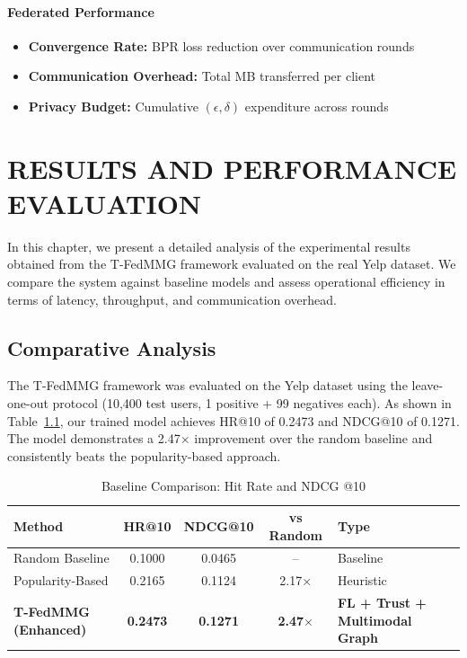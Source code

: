\documentclass[12pt,a4paper]{report}
\begin{document}
{\subsubsection{Federated Performance}
\begin{itemize}
    \item \textbf{Convergence Rate:} BPR loss reduction over communication rounds
    \item \textbf{Communication Overhead:} Total MB transferred per client
    \item \textbf{Privacy Budget:} Cumulative $(\epsilon, \delta)$ expenditure across rounds
\end{itemize}
\chapter{RESULTS AND PERFORMANCE EVALUATION}
\label{ch:results_performance}

In this chapter, we present a detailed analysis of the experimental results obtained from the T-FedMMG framework evaluated on the real Yelp dataset. We compare the system against baseline models and assess operational efficiency in terms of latency, throughput, and communication overhead.

\section{Comparative Analysis}
The T-FedMMG framework was evaluated on the Yelp dataset using the leave-one-out protocol (10,400 test users, 1 positive + 99 negatives each). As shown in Table~\ref{tab:baselines}, our trained model achieves HR@10 of 0.2473 and NDCG@10 of 0.1271. The model demonstrates a 2.47$\times$ improvement over the random baseline and consistently beats the popularity-based approach.
\begin{table}[h]
\centering
\small
\caption{Baseline Comparison: Hit Rate and NDCG @10}
\label{tab:baselines}
\renewcommand{\arraystretch}{1.2}
\begin{tabular}{|l|c|c|c|l|}
\hline
\textbf{Method} & \textbf{HR@10} & \textbf{NDCG@10} & \textbf{vs Random} & \textbf{Type} \\ \hline
Random Baseline & 0.1000 & 0.0465 & -- & Baseline \\ \hline
Popularity-Based & 0.2165 & 0.1124 & 2.17$\times$ & Heuristic \\ \hline
\textbf{T-FedMMG (Enhanced)} & \textbf{0.2473} & \textbf{0.1271} & \textbf{2.47$\times$} & \textbf{FL + Trust + Multimodal Graph} \\ \hline
\end{tabular}
\end{table}

}
\end{document}
